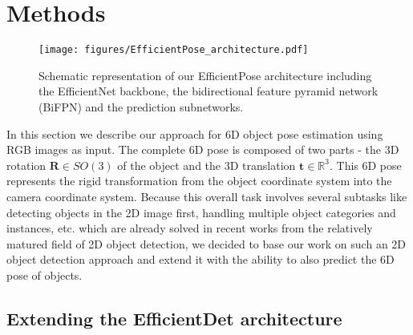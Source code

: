 \documentclass[twocolumn, 10pt, letterpaper]{article}
\begin{document}
\section{Methods}
\label{section_methods}

\begin{figure*}
\centering
\texttt{[image: figures/EfficientPose\_architecture.pdf]}
\caption{Schematic representation of our EfficientPose architecture including the EfficientNet\cite{EfficientNet} backbone, the bidirectional feature pyramid network (BiFPN) and the prediction subnetworks.}
\label{figure_efficientpose_architecture}
\end{figure*}

In this section we describe our approach for 6D object pose estimation using RGB images as input. The complete 6D pose is composed of two parts - the 3D rotation $\mathbf{R} \in SO(3)$ of the object and the 3D translation $\textbf{t} \in \mathbb{R}^3$. This 6D pose represents the rigid transformation from the object coordinate system into the camera coordinate system. Because this overall task involves several subtasks like detecting objects in the 2D image first, handling multiple object categories and instances, etc. which are already solved in recent works from the relatively matured field of 2D object detection, we decided to base our work on such an 2D object detection approach and extend it with the ability to also predict the 6D pose of objects.

\subsection{Extending the EfficientDet architecture}
\label{subsection_extending_efficientdet}
\end{document}
